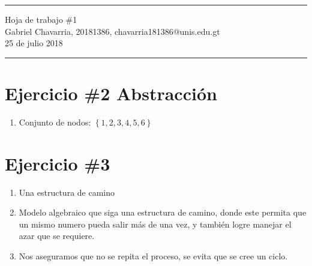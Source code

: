 \documentclass{article}
\newcommand{\horrule}[1]{\rule{\linewidth}{#1}}
\begin{document}
\begin{center}
        \horrule{0.5pt}
        \huge{Hoja de trabajo \#1} \\
        \large{Gabriel Chavarria, 20181386, chavarria181386@unis.edu.gt} \\
\large{25 de julio 2018}\\        
        \horrule{1pt}
\end{center}


\section*{Ejercicio \#2 Abstracción}
\begin{enumerate}
        \item{ Conjunto de nodos: $\left\lbrace 1,2,3,4,5,6\right\rbrace$}
        
       
\end{enumerate}
    
\section*{Ejercicio \#3}
\begin{enumerate}
        \item{ Una estructura de camino}
        \item{Modelo algebraico que siga una estructura de camino, donde este permita que un mismo numero pueda salir más de  una vez, y también logre manejar el azar que se requiere.  }
        \item{Nos aseguramos que no se repita el proceso, se evita que se cree un ciclo.}
                
\end{enumerate}
\end{document}
